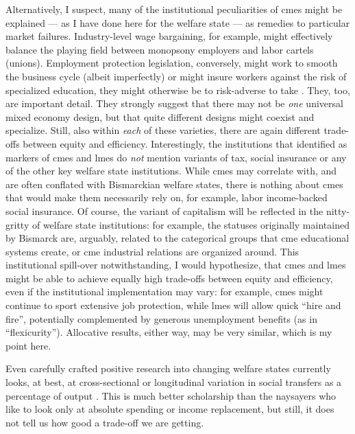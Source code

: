 \begin{enumerate}
{		Alternatively, I suspect, many of the institutional peculiarities of \glspl{cme} might be explained --- as I have done here for the welfare state --- as remedies to particular market failures.
		Industry-level wage bargaining, for example, might effectively balance the playing field between monopsony employers and labor cartels (unions).
		Employment protection legislation, conversely, might work to smooth the business cycle (albeit imperfectly) or might insure workers against the risk of specialized education, they might otherwise be to risk-adverse to take \citep[for example,][444]{Offe2003}.
	}
	They, too, are important detail.
	They strongly suggest that there may not be \emph{one} universal mixed economy design, but that quite different designs might coexist and specialize.
	Still, also within \emph{each} of these varieties, there are again different trade-offs between equity and efficiency.
	Interestingly, the institutions that \citeauthor{HallSoskice-2001-aa} identified as markers of \glspl{cme} and \glspl{lme} do \emph{not} mention variants of tax, social insurance or any of the other key welfare state institutions.
	While \glspl{cme} may correlate with, and are often conflated with Bismarckian welfare states, there is nothing about \glspl{cme} that would make them necessarily rely on, for example, labor income-backed social insurance.
	Of course, the variant of capitalism will be reflected in the nitty-gritty of welfare state institutions:
	for example, the statuses originally maintained by Bismarck are, arguably, related to the categorical groups that \gls{cme} educational systems create, or \gls{cme} industrial relations are organized around.
	This institutional spill-over notwithstanding, I would hypothesize, that \glspl{cme} and \glspl{lme} might be able to achieve equally high trade-offs between equity and efficiency, even if the institutional implementation may vary:
	for example, \glspl{cme} might continue to sport extensive job protection, while \glspl{lme} will allow quick ``hire and fire'', potentially complemented by generous unemployment benefits (as in ``flexicurity'').
	Allocative results, either way, may be very similar, which is my point here.

	Even carefully crafted positive research into changing welfare states currently looks, at best, at cross-sectional or longitudinal variation in social transfers as a percentage of output \citep[for example,][249]{Ravenhill2005}.
	This is much better scholarship than the naysayers who like to look only at absolute spending or income replacement, but still, it does not tell us how good a trade-off we are getting.


\end{enumerate}

